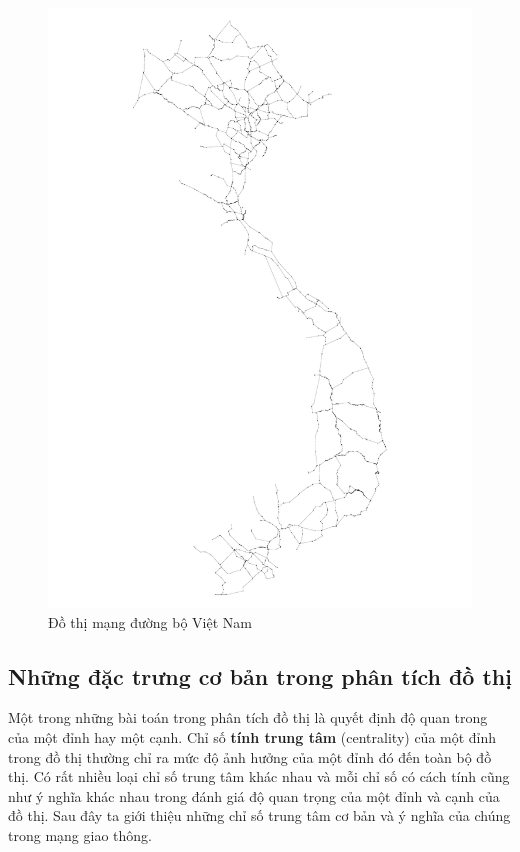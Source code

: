 \documentclass[14pt, oneside, a4paper, openany]{scrartcl}
\begin{document}
\begin{figure}[!h]
	\centering
	\includegraphics[scale=0.5]{figures/vietnamroad.pdf} 
	\caption[Đồ thị mạng đường bộ Việt Nam]{Đồ thị mạng đường bộ Việt Nam}
\end{figure}

\subsection{Những đặc trưng cơ bản trong phân tích đồ thị}
Một trong những bài toán trong phân tích đồ thị là quyết định độ quan trong của một đỉnh hay một cạnh. Chỉ số \textbf{tính trung tâm}  (centrality) của một đỉnh trong đồ thị thường chỉ ra mức độ ảnh hưởng của một đỉnh đó đến toàn bộ đồ thị. Có rất nhiều loại chỉ số trung tâm khác nhau và mỗi chỉ số có cách tính cũng như ý nghĩa khác nhau trong đánh giá độ quan trọng của một đỉnh và cạnh của đồ thị. Sau đây ta giới thiệu những chỉ số trung tâm cơ bản và ý nghĩa của chúng trong mạng giao thông.
\end{document}
